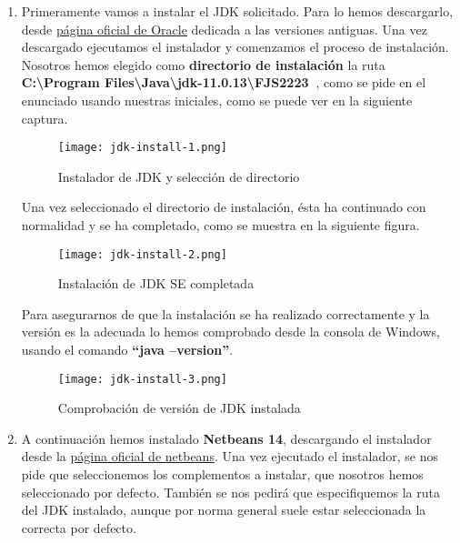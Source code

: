 \begin{enumerate}[label=(\alph*)]
    \item Primeramente vamos a instalar el JDK solicitado. Para lo hemos descargarlo, desde \href{https://www.oracle.com/java/technologies/javase/jdk13-archive-downloads.html}{página oficial de Oracle} dedicada a las versiones antiguas. Una vez descargado ejecutamos el instalador y comenzamos el proceso de instalación. Nosotros hemos elegido como \textbf{directorio de instalación} la ruta \textbf{C:\textbackslash Program Files\textbackslash Java\textbackslash jdk-11.0.13\textbackslash FJS2223\ }, como se pide en el enunciado usando nuestras iniciales, como se puede ver en la siguiente captura.

    \begin{figure}[ht]
        \centering
        \texttt{[image: jdk-install-1.png]}
        \caption{Instalador de JDK y selección de directorio}
    \end{figure}

    Una vez seleccionado el directorio de instalación, ésta ha continuado con normalidad y se ha completado, como se muestra en la siguiente figura.

    \begin{figure}[ht]
        \centering
        \texttt{[image: jdk-install-2.png]}
        \caption{Instalación de JDK SE completada}
    \end{figure}

    Para asegurarnos de que la instalación se ha realizado correctamente y la versión es la adecuada lo hemos comprobado desde la consola de Windows, usando el comando \textbf{``java --version''}.

    \begin{figure}[ht]
        \centering
        \texttt{[image: jdk-install-3.png]}
        \caption{Comprobación de versión de JDK instalada}
    \end{figure}

    \item A continuación hemos instalado \textbf{Netbeans 14}, descargando el instalador desde la \href{https://netbeans.apache.org/download/nb14/}{página oficial de netbeans}. Una vez ejecutado el instalador, se nos pide que seleccionemos los complementos a instalar, que nosotros hemos seleccionado por defecto. También se nos pedirá que especifiquemos la ruta del JDK instalado, aunque por norma general suele estar seleccionada la correcta por defecto.


\end{enumerate}
